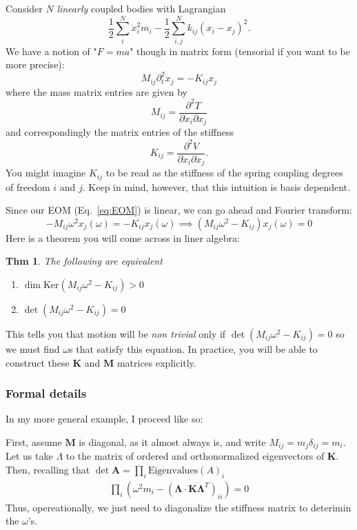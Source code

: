 \documentclass{article}
\newtheorem*{theorem}{Thm}
\theoremstyle{definition}
\theoremstyle{remark}
\theoremstyle{example}
\begin{document}
Consider $N$ \emph{linearly} coupled bodies with Lagrangian
$$
\frac{1}{2}\sum_i^N \dot x_i^2 m_i - \frac{1}{2}\sum_{i,j}^N k_{ij}(x_i-x_j)^2.
$$
We have a notion of "$F=ma$" though in matrix form (tensorial if you want to be more precise):
\begin{equation}\label{eq:EOM}
M_{ij}\partial_t^2x_j = -K_{ij}x_j
\end{equation}
where the mass matrix entries are given by
$$
M_{ij} = \frac{\partial^2 T}{\partial\dot x_i\partial x_j}
$$
and correspondingly the matrix entries of the stiffness 
$$
K_{ij} = \frac{\partial^2 V}{\partial\dot x_i\partial x_j}.
$$
You might imagine $K_{ij}$ to be read as the stiffness of the spring coupling degrees of freedom $i$ and $j$. Keep in mind, however, that this intuition is basis dependent. 

Since our EOM (Eq.~\ref{eq:EOM}) is linear, we can go ahead and Fourier transform:
 $$
 -M_{ij}\omega^2x_j(\omega) = -K_{ij}x_j(\omega)\implies (M_{ij}\omega^2-K_{ij})x_{j}(\omega)=0
 $$
 Here is a theorem you will come across in liner algebra:
\begin{theorem}
The following are equivalent
\begin{enumerate}
  \item $\dim\text{Ker} (M_{ij}\omega^2-K_{ij})>0$
  \item $\det (M_{ij}\omega^2-K_{ij})=0$
\end{enumerate}
\end{theorem}
This tells you that motion will be \emph{non trivial} only if $\det (M_{ij}\omega^2-K_{ij})=0$ so we must find $\omega$s that satisfy this equation. In practice, you will be able to construct these $\mathbf K$ and $\mathbf M$ matrices explicitly.

\subsubsection*{Formal details}

In my more general example, I proceed like so:

First, assume $\mathbf M$ is diagonal, as it almost always is, and write $M_{ij}=m_j\delta_{ij}=m_i$. Let us take $\Lambda$ to the matrix of ordered and orthonormalized eigenvectors of $\mathbf K$. Then, recalling that $\det \mathbf A = \prod_i \text{Eigenvalues}(A)_i$
\begin{align*}
  \prod_{i}(\omega^2m_i -(\mathbf\Lambda\cdot \mathbf K\mathbf\Lambda^T)_{ii})=0
\end{align*}
Thus, opereationally, we just need to diagonalize the stiffness matrix to deterimin the $\omega$'s.
\end{document}
